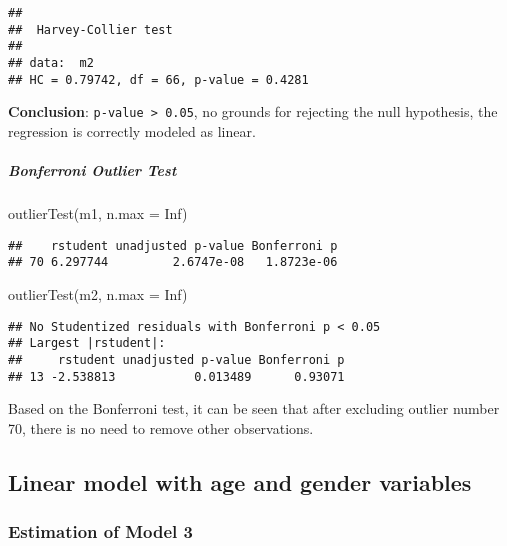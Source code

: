 \documentclass[
]{article}
\newenvironment{Shaded}{\begin{snugshade}}{\end{snugshade}}
\newcommand{\AttributeTok}[1]{\textcolor[rgb]{0.77,0.63,0.00}{#1}}
\newcommand{\ConstantTok}[1]{\textcolor[rgb]{0.00,0.00,0.00}{#1}}
\newcommand{\FunctionTok}[1]{\textcolor[rgb]{0.00,0.00,0.00}{#1}}
\newcommand{\NormalTok}[1]{#1}
\begin{document}
\begin{verbatim}
## 
##  Harvey-Collier test
## 
## data:  m2
## HC = 0.79742, df = 66, p-value = 0.4281
\end{verbatim}

\textbf{Conclusion}: \texttt{p-value\ \textgreater{}\ 0.05}, no grounds
for rejecting the null hypothesis, the regression is correctly modeled
as linear.

\hypertarget{bonferroni-outlier-test}{%
\subparagraph{Bonferroni Outlier Test}\label{bonferroni-outlier-test}}

\begin{Shaded}
\begin{Highlighting}[]
\FunctionTok{outlierTest}\NormalTok{(m1, }\AttributeTok{n.max =} \ConstantTok{Inf}\NormalTok{)}
\end{Highlighting}
\end{Shaded}

\begin{verbatim}
##    rstudent unadjusted p-value Bonferroni p
## 70 6.297744         2.6747e-08   1.8723e-06
\end{verbatim}

\begin{Shaded}
\begin{Highlighting}[]
\FunctionTok{outlierTest}\NormalTok{(m2, }\AttributeTok{n.max =} \ConstantTok{Inf}\NormalTok{)}
\end{Highlighting}
\end{Shaded}

\begin{verbatim}
## No Studentized residuals with Bonferroni p < 0.05
## Largest |rstudent|:
##     rstudent unadjusted p-value Bonferroni p
## 13 -2.538813           0.013489      0.93071
\end{verbatim}

Based on the Bonferroni test, it can be seen that after excluding
outlier number 70, there is no need to remove other observations.

\hypertarget{linear-model-with-age-and-gender-variables}{%
\subsection{Linear model with age and gender
variables}\label{linear-model-with-age-and-gender-variables}}

\hypertarget{estimation-of-model-3}{%
\subsubsection{Estimation of Model 3}\label{estimation-of-model-3}}
\end{document}
